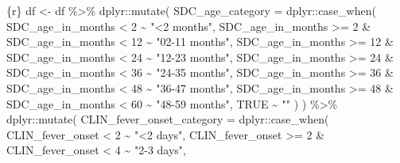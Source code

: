 \documentclass[
  letterpaper,
  DIV=11,
  numbers=noendperiod,
  oneside]{scrreprt}
\newenvironment{Shaded}{\begin{snugshade}}{\end{snugshade}}
\newcommand{\AttributeTok}[1]{\textcolor[rgb]{0.40,0.45,0.13}{#1}}
\newcommand{\ConstantTok}[1]{\textcolor[rgb]{0.56,0.35,0.01}{#1}}
\newcommand{\DecValTok}[1]{\textcolor[rgb]{0.68,0.00,0.00}{#1}}
\newcommand{\FunctionTok}[1]{\textcolor[rgb]{0.28,0.35,0.67}{#1}}
\newcommand{\InformationTok}[1]{\textcolor[rgb]{0.37,0.37,0.37}{#1}}
\newcommand{\NormalTok}[1]{\textcolor[rgb]{0.00,0.23,0.31}{#1}}
\newcommand{\OtherTok}[1]{\textcolor[rgb]{0.00,0.23,0.31}{#1}}
\newcommand{\SpecialCharTok}[1]{\textcolor[rgb]{0.37,0.37,0.37}{#1}}
\newcommand{\StringTok}[1]{\textcolor[rgb]{0.13,0.47,0.30}{#1}}
\begin{document}
\begin{Shaded}
\begin{Highlighting}[]
\InformationTok{\textasciigrave{}\textasciigrave{}\textasciigrave{}\{r\}}
\NormalTok{df }\OtherTok{\textless{}{-}}\NormalTok{ df }\SpecialCharTok{\%\textgreater{}\%}
\NormalTok{  dplyr}\SpecialCharTok{::}\FunctionTok{mutate}\NormalTok{(}
    \AttributeTok{SDC\_age\_category =}\NormalTok{ dplyr}\SpecialCharTok{::}\FunctionTok{case\_when}\NormalTok{(}
\NormalTok{      SDC\_age\_in\_months }\SpecialCharTok{\textless{}} \DecValTok{2} \SpecialCharTok{\textasciitilde{}} \StringTok{"\textless{}2 months"}\NormalTok{,}
\NormalTok{      SDC\_age\_in\_months }\SpecialCharTok{\textgreater{}=} \DecValTok{2} \SpecialCharTok{\&}\NormalTok{ SDC\_age\_in\_months }\SpecialCharTok{\textless{}} \DecValTok{12} \SpecialCharTok{\textasciitilde{}} \StringTok{"02{-}11 months"}\NormalTok{,}
\NormalTok{      SDC\_age\_in\_months }\SpecialCharTok{\textgreater{}=} \DecValTok{12} \SpecialCharTok{\&}\NormalTok{ SDC\_age\_in\_months }\SpecialCharTok{\textless{}} \DecValTok{24} \SpecialCharTok{\textasciitilde{}} \StringTok{"12{-}23 months"}\NormalTok{,}
\NormalTok{      SDC\_age\_in\_months }\SpecialCharTok{\textgreater{}=} \DecValTok{24} \SpecialCharTok{\&}\NormalTok{ SDC\_age\_in\_months }\SpecialCharTok{\textless{}} \DecValTok{36} \SpecialCharTok{\textasciitilde{}} \StringTok{"24{-}35 months"}\NormalTok{,}
\NormalTok{      SDC\_age\_in\_months }\SpecialCharTok{\textgreater{}=} \DecValTok{36} \SpecialCharTok{\&}\NormalTok{ SDC\_age\_in\_months }\SpecialCharTok{\textless{}} \DecValTok{48} \SpecialCharTok{\textasciitilde{}} \StringTok{"36{-}47 months"}\NormalTok{,}
\NormalTok{      SDC\_age\_in\_months }\SpecialCharTok{\textgreater{}=} \DecValTok{48} \SpecialCharTok{\&}\NormalTok{ SDC\_age\_in\_months }\SpecialCharTok{\textless{}} \DecValTok{60} \SpecialCharTok{\textasciitilde{}} \StringTok{"48{-}59 months"}\NormalTok{,}
      \ConstantTok{TRUE} \SpecialCharTok{\textasciitilde{}} \StringTok{""}
\NormalTok{    )}
\NormalTok{  ) }\SpecialCharTok{\%\textgreater{}\%} 
\NormalTok{  dplyr}\SpecialCharTok{::}\FunctionTok{mutate}\NormalTok{(}
    \AttributeTok{CLIN\_fever\_onset\_category =}\NormalTok{ dplyr}\SpecialCharTok{::}\FunctionTok{case\_when}\NormalTok{(}
\NormalTok{      CLIN\_fever\_onset }\SpecialCharTok{\textless{}} \DecValTok{2} \SpecialCharTok{\textasciitilde{}} \StringTok{"\textless{}2 days"}\NormalTok{,}
\NormalTok{      CLIN\_fever\_onset }\SpecialCharTok{\textgreater{}=} \DecValTok{2} \SpecialCharTok{\&}\NormalTok{ CLIN\_fever\_onset }\SpecialCharTok{\textless{}} \DecValTok{4} \SpecialCharTok{\textasciitilde{}} \StringTok{"2{-}3 days"}\NormalTok{,}

\end{Highlighting}
\end{Shaded}
\end{document}
